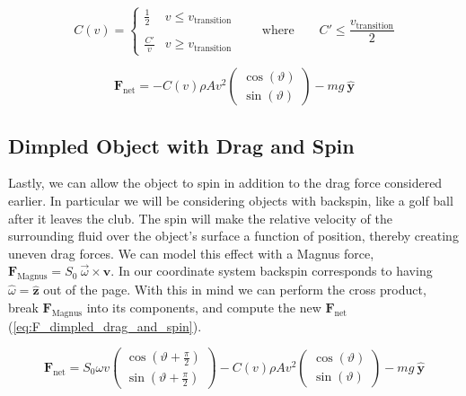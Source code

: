 \documentclass[notitlepage,aps,prd,nofootinbib]{revtex4-1}
\begin{document}
\begin{equation} \label{eq:Cv}
C\left(v\right) =
  \begin{cases} 
    \frac{1}{2} & v \leq v_{\text{transition}} \\
    \\
    \frac{C'}{v} & v \geq v_{\text{transition}}
  \end{cases}
\qquad \text{where} \qquad
C' \leq \frac{v_{\text{transition}}}{2}
\end{equation}

\begin{equation} \label{eq:F_dimpled_drag}
\mathbf{F}_{\text{net}} = - C\left(v\right) \rho A v^{2}
\begin{pmatrix}
  \cos(\vartheta) \\
  \sin(\vartheta)
\end{pmatrix}
-m g~\hat{\mathbf{y}}
\end{equation}

\subsection{Dimpled Object with Drag and Spin} \label{subsec:dimpled_drag_spin}
Lastly, we can allow the object to spin in addition to the drag force considered earlier. In particular we will be considering objects with backspin, like a golf ball after it leaves the club. The spin will make the relative velocity of the surrounding fluid over the object's surface a function of position, thereby creating uneven drag forces. We can model this effect with a Magnus force, $\mathbf{F}_{\text{Magnus}} = S_{0}~\vec{\omega} \times \mathbf{v}$. In our coordinate system backspin corresponds to having $\hat{\omega} = \hat{\mathbf{z}}$ out of the page. With this in mind we can perform the cross product, break $\mathbf{F}_{\text{Magnus}}$ into its components, and compute the new $\mathbf{F}_{\text{net}}$ (\ref{eq:F_dimpled_drag_and_spin}).

\begin{equation} \label{eq:F_dimpled_drag_and_spin}
\mathbf{F}_{\text{net}} = S_{0} \omega v 
\begin{pmatrix}
  \cos(\vartheta + \frac{\pi}{2}) \\
  \sin(\vartheta + \frac{\pi}{2})
\end{pmatrix}
- C\left(v\right) \rho A v^{2}
\begin{pmatrix}
  \cos(\vartheta) \\
  \sin(\vartheta)
\end{pmatrix}
-m g~\hat{\mathbf{y}}
\end{equation}
\end{document}

